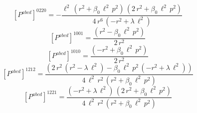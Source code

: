 \documentclass[11pt]{article}
\begin{document}
\begin{dmath*}[breakdepth={5}]
\left[P^{abcd}\right]^{0220} = -\frac{{\ell}^{2}\,\left({r}^{2} + \beta_{0}\,{\ell}^{2}\,{p}^{2}\right)\,\left(2\,{r}^{2} + \beta_{0}\,{\ell}^{2}\,{p}^{2}\right)}{4\,{r}^{6}\,\left(-{r}^{2} + \lambda\,{\ell}^{2}\right)}
\end{dmath*}
\begin{dmath*}[breakdepth={5}]
\left[P^{abcd}\right]^{1001} = \frac{\left({r}^{2} - \beta_{0}\,{\ell}^{2}\,{p}^{2}\right)}{2\,{r}^{2}}
\end{dmath*}
\begin{dmath*}[breakdepth={5}]
\left[P^{abcd}\right]^{1010} = \frac{\left(-{r}^{2} + \beta_{0}\,{\ell}^{2}\,{p}^{2}\right)}{2\,{r}^{2}}
\end{dmath*}
\begin{dmath*}[breakdepth={5}]
\left[P^{abcd}\right]^{1212} = \frac{\left(2\,{r}^{2}\,\left({r}^{2} - \lambda\,{\ell}^{2}\right) - \beta_{0}\,{\ell}^{2}\,{p}^{2}\,\left(-{r}^{2} + \lambda\,{\ell}^{2}\right)\right)}{4\,{\ell}^{2}\,{r}^{2}\,\left({r}^{2} + \beta_{0}\,{\ell}^{2}\,{p}^{2}\right)}
\end{dmath*}
\begin{dmath*}[breakdepth={5}]
\left[P^{abcd}\right]^{1221} = \frac{\left(-{r}^{2} + \lambda\,{\ell}^{2}\right)\,\left(2\,{r}^{2} + \beta_{0}\,{\ell}^{2}\,{p}^{2}\right)}{4\,{\ell}^{2}\,{r}^{2}\,\left({r}^{2} + \beta_{0}\,{\ell}^{2}\,{p}^{2}\right)}
\end{dmath*}
\end{document}
